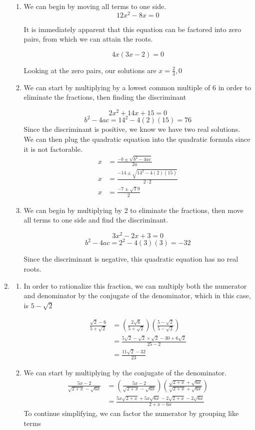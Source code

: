 \documentclass[11pt, letterpaper, twoside, tikz]{article}
\begin{document}
\begin{enumerate}
\begin{enumerate}[label=(\alph*)]
\item We can begin by moving all terms to one side.
$$12x^2-8x=0$$

It is immediately apparent that this equation can be factored into zero pairs, from which we can attain the roots.

$$4x(3x-2)=0$$

Looking at the zero pairs, our solutions are $\boxed{x=\frac{2}{3}, 0}$

\item We can start by multiplying by a lowest common multiple of 6 in order to eliminate the fractions, then finding the discriminant

$$2x^2+14x+15=0$$
$$b^2-4ac=14^2-4(2)(15)=76$$
Since the discriminant is positive, we know we have two real solutions. We can then plug the quadratic equation into the quadratic formula since it is not factorable.
\begin{align*}
x &= \frac{-b\pm \sqrt{b^2-4ac}}{2a}\\
x &= \frac{-14\pm \sqrt{14^2-4(2)(15)}}{2\cdot 2}\\
x &= \frac{-7\pm\sqrt19}{2}
\end{align*}

\item We can begin by multiplying by 2 to eliminate the fractions, then move all terms to one side and find the discriminant.

$$3x^2-2x+3=0$$
$$b^2-4ac=2^2-4(3)(3)=-32$$

Since the discriminant is negative, this quadratic equation has no real roots.
\end{enumerate}

\item \begin{enumerate}[label=(\alph*)]
\pagebreak
\item In order to rationalize this fraction, we can multiply both the numerator and denominator by the conjugate of the denominator, which in this case, is $5-\sqrt2$

\begin{align*}
\frac{\sqrt{2}-6}{5+\sqrt2}&= \left(\frac{2\sqrt6}{5+\sqrt2} \right)\left( \frac{5-\sqrt2}{5-\sqrt2}\right)\\
&= \frac{5\sqrt2-\sqrt2\times\sqrt2-30+6\sqrt2}{25-2}\\
&= \frac{11\sqrt2-32}{23}
\end{align*}

\item We can start by multiplying by the conjugate of the denominator.
\begin{align*}
\frac{5x-2}{\sqrt{2+x}-\sqrt{6x}}&= \left( \frac{5x-2}{\sqrt{2+x}-\sqrt{6x}}\right)\left( \frac{\sqrt{2+x}+\sqrt{6x}}{\sqrt{2+x}+\sqrt{6x}}\right)\\
&= \frac{5x\sqrt{2+x}+5x\sqrt{6x}-2\sqrt{2+x}-2\sqrt{6x}}{2+x-6x}
\end{align*}
To continue simplifying, we can factor the numerator by grouping like terms


\end{enumerate}
\end{enumerate}
\end{document}

